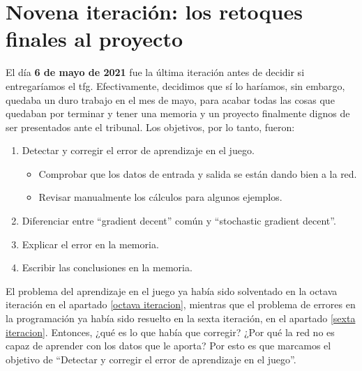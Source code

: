 \section{Novena iteración: los retoques finales al proyecto}
\label{novena iteracion}
El día \textbf{6 de mayo de 2021} fue la última iteración antes de decidir si entregaríamos el \gls{tfg}. Efectivamente, decidimos que sí lo haríamos, sin embargo, quedaba un duro trabajo en el mes de mayo, para acabar todas las cosas que quedaban por terminar y tener una memoria y un proyecto finalmente dignos de ser presentados ante el tribunal. Los objetivos, por lo tanto, fueron:
\begin{enumerate}
	\item Detectar y corregir el error de aprendizaje en el juego.
	\begin{itemize}
		\item Comprobar que los datos de entrada y salida se están dando bien a la red.
		\item Revisar manualmente los cálculos para algunos ejemplos.
	\end{itemize}
	\item Diferenciar entre ``gradient decent'' común y ``stochastic gradient decent''.
	\item Explicar el error en la memoria.
	\item Escribir las conclusiones en la memoria.
\end{enumerate}

El problema del aprendizaje en el juego ya había sido solventado en la octava iteración en el apartado \ref{octava iteracion}, mientras que el problema de errores en la programación ya había sido resuelto en la sexta iteración, en el apartado \ref{sexta iteracion}. Entonces, ¿qué es lo que había que corregir? ¿Por qué la red no es capaz de aprender con los datos que le aporta? Por esto es que marcamos el objetivo de ``Detectar y corregir el error de aprendizaje en el juego''.

